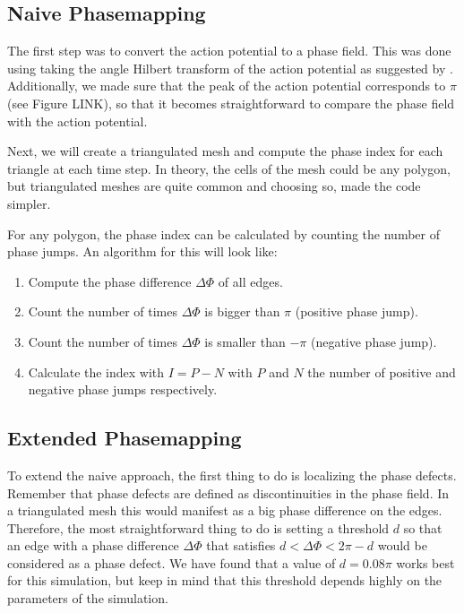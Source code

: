 \documentclass[twocolumn]{article}
\begin{document}
\subsection{Naive Phasemapping}\label{naive-phasemapping}

The first step was to convert the action potential to a phase field.
This was done using taking the angle Hilbert transform of the action
potential as suggested by \autocite{bray2002considerations}. Additionally,
we made sure that the peak of the action potential corresponds to
\(\pi\) (see Figure LINK), so that it becomes straightforward to compare
the phase field with the action potential.

Next, we will create a triangulated mesh and compute the phase index for
each triangle at each time step. In theory, the cells of the mesh could
be any polygon, but triangulated meshes are quite common and choosing
so, made the code simpler.

For any polygon, the phase index can be calculated by counting the
number of phase jumps. An algorithm for this will look like:

\begin{enumerate}
\def\labelenumi{\arabic{enumi}.}
\tightlist
\item
  Compute the phase difference \(\Delta\Phi\) of all edges.
\item
  Count the number of times \(\Delta\Phi\) is bigger than \(\pi\)
  (positive phase jump).
\item
  Count the number of times \(\Delta\Phi\) is smaller than \(-\pi\)
  (negative phase jump).
\item
  Calculate the index with \(I = P - N\) with \(P\) and \(N\) the number
  of positive and negative phase jumps respectively.
\end{enumerate}

\subsection{Extended Phasemapping}\label{extended-phasemapping}

To extend the naive approach, the first thing to do is localizing the
phase defects. Remember that phase defects are defined as
discontinuities in the phase field. In a triangulated mesh this would
manifest as a big phase difference on the edges. Therefore, the most
straightforward thing to do is setting a threshold \(d\) so that an edge
with a phase difference \(\Delta\Phi\) that satisfies
\(d<\Delta\Phi<2\pi-d\) would be considered as a phase defect. We have
found that a value of \(d=0.08\pi\) works best for this simulation, but
keep in mind that this threshold depends highly on the parameters of the
simulation.
\end{document}
